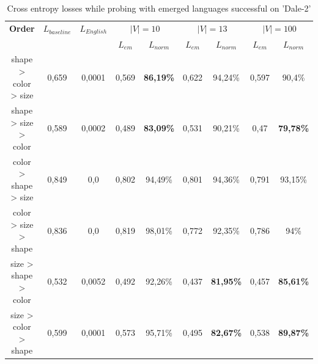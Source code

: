 \begin{table}[ht]
    \centering
    \begin{tabular}{c|cc|cc|cc|cc}
        \toprule
        \textbf{Order}          & $L_{baseline}$ & $L_{English}$ & \multicolumn{2}{c}{$|V| = 10$} & \multicolumn{2}{c}{$|V| = 13$} & \multicolumn{2}{c}{$|V| = 100$}                                                      \\\cmidrule(lr){4-5}\cmidrule(lr){6-7}\cmidrule(lr){8-9}
                                &                &               & $L_{em}$                       & $L_{norm}$                     & $L_{em}$                        & $L_{norm}$         & $L_{em}$ & $L_{norm}$         \\\midrule
        {shape > color > size}  & {0,659}        & {0,0001}      & {0,569}                        & \textbf{86,19\%}               & {0,622}                         & {94,24\%}          & {0,597}  & {90,4\%}           \\
        {shape > size > color}  & {0,589}        & {0,0002}      & {0,489}                        & \textbf{83,09\%}               & {0,531}                         & {90,21\%}          & {0,47}   & {\textbf{79,78\%}} \\
        {color > shape > size}  & {0,849}        & {0,0}         & {0,802}                        & 94,49\%                        & {0,801}                         & {94,36\%}          & {0,791}  & {93,15\%}          \\
        {color  > size > shape} & {0,836}        & {0,0}         & {0,819}                        & 98,01\%                        & {0,772}                         & {92,35\%}          & {0,786}  & {94\%}             \\
        {size > shape > color}  & {0,532}        & {0,0052}      & {0,492}                        & 92,26\%                        & {0,437}                         & {\textbf{81,95\%}} & {0,457}  & {\textbf{85,61\%}} \\
        {size > color > shape}  & {0,599}        & {0,0001}      & {0,573}                        & 95,71\%                        & {0,495}                         & {\textbf{82,67\%}} & {0,538}  & {\textbf{89,87\%}} \\
        \bottomrule
    \end{tabular}
    \caption{Cross entropy losses while probing with emerged languages successful on 'Dale-2'}
    \label{tab:probing_discrimnator_language}
\end{table}

